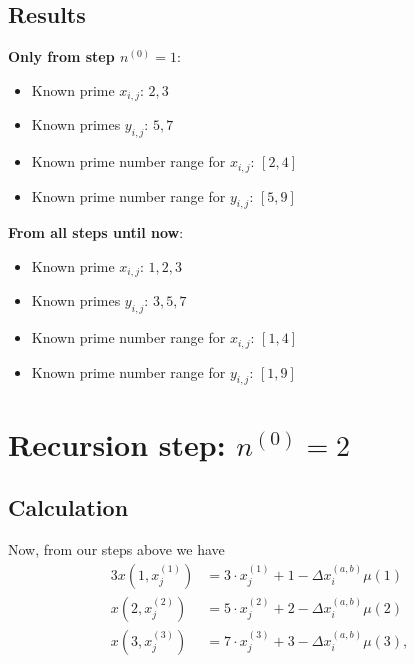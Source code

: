\subsection{Results}
\label{ss:resultsstepn0_1}
\textbf{Only from step $n^{\left(0\right)} = 1$}:
\begin{itemize}
	\item Known prime $x_{i,j}$: $2,3$
	\item Known primes $y_{i,j}$: $5,7$
	\item Known prime number range for $x_{i,j}$: $[2,4]$
	\item Known prime number range for $y_{i,j}$: $[5,9]$
\end{itemize}

\textbf{From all steps until now}:
\begin{itemize}
	\item Known prime $x_{i,j}$: $1,2,3$
	\item Known primes $y_{i,j}$: $3,5,7$
	\item Known prime number range for $x_{i,j}$: $[1,4]$
	\item Known prime number range for $y_{i,j}$: $[1,9]$
\end{itemize}

\section{Recursion step: $n^{\left(0\right)} = 2$}
\label{s:recursionstepn0_2}
\subsection{Calculation}
\label{ss:calcualtionstepn0_2}
Now, from our steps above we have 
\begin{alignat}{3}
	x\left(1,x_{j}^{\left(1\right)}\right) &= 3\cdot x_{j}^{\left(1\right)} + 1 - \Delta x_{i}^{\left(a,b\right)}\mu\left(1\right) \label{eq:stepn0_2_eq3} \\
	x\left(2,x_{j}^{\left(2\right)}\right) &= 5\cdot x_{j}^{\left(2\right)} + 2 - \Delta x_{i}^{\left(a,b\right)}\mu\left(2\right) \label{eq:stepn0_2_eq5} \\
	x\left(3,x_{j}^{\left(3\right)}\right) &= 7\cdot x_{j}^{\left(3\right)} + 3 - \Delta x_{i}^{\left(a,b\right)}\mu\left(3\right), \label{eq:stepn0_2_eq7}
\end{alignat} 


